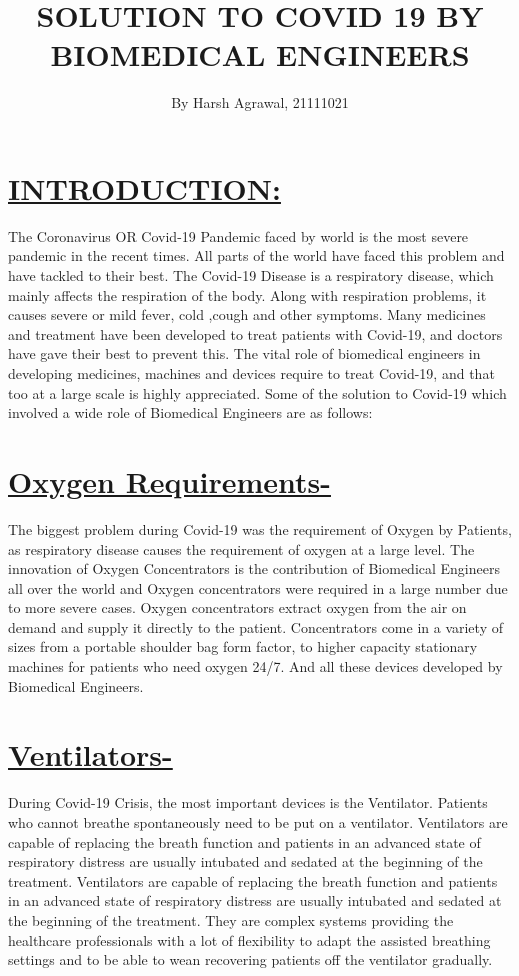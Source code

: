\documentclass[18pt]{article}
\title{\textbf{SOLUTION TO COVID 19 BY BIOMEDICAL ENGINEERS}}
\author{By Harsh Agrawal, 21111021}
\date{}
\begin{document}
\maketitle
\section{\underline{INTRODUCTION:}}
The Coronavirus OR Covid-19 Pandemic faced by world is the most severe pandemic in the recent times. All parts of the world have faced this problem and have tackled to their best. The Covid-19 Disease is a respiratory disease, which mainly affects the respiration of the body. Along with respiration problems, it causes severe or mild fever, cold ,cough and other symptoms. Many medicines and treatment have been developed to treat patients with Covid-19, and doctors have gave their best to prevent this.
\newline The vital role of biomedical engineers in developing medicines, machines and devices require to treat Covid-19, and that too at a large scale is highly appreciated.
\newline Some of the solution to Covid-19 which involved a wide role of Biomedical Engineers are as follows:

\section{\underline{Oxygen Requirements- }}
The biggest problem during Covid-19 was the requirement of Oxygen by Patients, as respiratory disease causes the requirement of oxygen at a large level. The innovation of Oxygen Concentrators is the contribution of Biomedical Engineers all over the world and Oxygen concentrators were required in a large number due to more severe cases.
 Oxygen concentrators extract oxygen from the air on demand and supply it directly to the patient. Concentrators come in a variety of sizes from a portable shoulder bag form factor, to higher capacity stationary machines for patients who need oxygen 24/7. And all these devices developed by Biomedical Engineers.

\section{\underline{Ventilators-}}
During Covid-19 Crisis, the most important devices is the Ventilator. Patients who cannot breathe spontaneously need to be put on a ventilator. Ventilators are capable of replacing the breath function and patients in an advanced state of respiratory distress are usually intubated and sedated at the beginning of the treatment.
Ventilators are capable of replacing the breath function and patients in an advanced state of respiratory distress are usually intubated and sedated at the beginning of the treatment. They are complex systems providing the healthcare professionals with a lot of flexibility to adapt the assisted breathing settings and to be able to wean recovering patients off the ventilator gradually.
\end{document}
